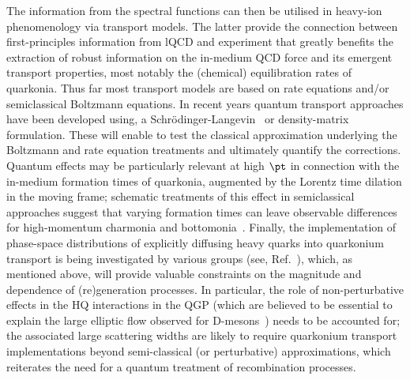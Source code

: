 \documentclass[../report.tex]{subfiles}
\begin{document}
The information from the spectral functions can then be utilised in heavy-ion phenomenology via transport models. The latter provide the connection between first-principles information from lQCD and experiment that greatly benefits the extraction of robust information on the in-medium QCD force and its emergent transport properties, most notably the (chemical) equilibration rates of quarkonia. 
Thus far most transport models are based on rate equations and/or semiclassical Boltzmann equations. In recent years quantum transport approaches have been developed using, \eg a Schr\"odinger-Langevin~\cite{Blaizot:2015hya,Katz:2015qja,Kajimoto:2017rel,Petreczky:2016etz} or density-matrix~\cite{Akamatsu:2014qsa,Brambilla:2016wgg} formulation. These will enable to test the classical approximation underlying the Boltzmann and rate equation treatments and ultimately quantify the corrections.  Quantum effects may be particularly relevant at high $\pt$ in connection with the in-medium formation times of quarkonia, augmented by the Lorentz time dilation in the moving frame; schematic treatments of this effect in semiclassical approaches suggest that varying formation times can leave observable differences for high-momentum charmonia and bottomonia~\cite{Song:2015bja,Hoelck:2016tqf,Du:2017qkv,Aronson:2017ymv,Krouppa:2017jlg}. 
Finally, the implementation of phase-space distributions of explicitly diffusing heavy quarks into quarkonium transport is being investigated by various groups (see, \eg Ref.~\cite{Yao:2017fuc}), which, as mentioned above, will provide valuable constraints on the magnitude and \pt dependence of (re)generation processes.  
In particular, the role of non-perturbative effects in the HQ interactions in the QGP 
  (which are believed to be essential to explain the large elliptic flow observed for 
  D-mesons~\cite{Rapp:2018qla}) needs to be accounted for; the associated large 
  scattering widths are likely to require quarkonium transport implementations beyond 
  semi-classical (or perturbative) approximations, which reiterates the need for 
  a quantum treatment of recombination processes.

\end{document}
